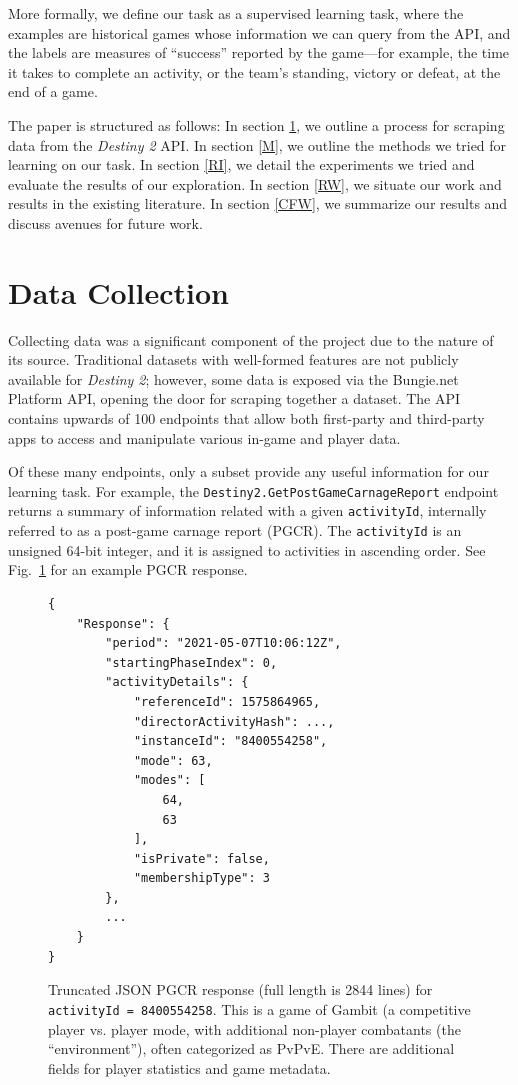 \documentclass[conference]{IEEEtran}
\begin{document}
More formally, we define our task as a supervised learning task, where the
examples are historical games whose information we can query from the API, and
the labels are measures of ``success'' reported by the game—for example, the
time it takes to complete an activity, or the team's standing, victory or
defeat, at the end of a game.

The paper is structured as follows: In section \ref{DC}, we
outline a process for scraping data from the \textit{Destiny 2} API. In
section \ref{M}, we outline the methods we tried for learning on
our task. In section \ref{RI}, we detail the experiments we tried
and evaluate the results of our exploration. In section \ref{RW},
we situate our work and results in the existing literature. In section
\ref{CFW}, we summarize our results and discuss avenues for future
work.

\section{Data Collection}\label{DC}

Collecting data was a significant component of the project due to the nature of
its source. Traditional datasets with well-formed features are not publicly
available for \textit{Destiny 2}; however, some data is exposed via the
Bungie.net Platform API, opening the door for scraping together a dataset. The
API contains upwards of 100 endpoints that allow both first-party and
third-party apps to access and manipulate various in-game and player data.

Of these many endpoints, only a subset provide any useful information for our
learning task. For example, the \texttt{Destiny2.GetPostGameCarnageReport} endpoint returns a
summary of information related with a given \texttt{activityId}, internally
referred to as a post-game carnage report (PGCR). The \texttt{activityId}
is an unsigned 64-bit integer, and it is assigned to activities in ascending
order. See Fig.~\ref{response} for an example PGCR response.

\begin{figure}[htbp]
    \begin{Verbatim}[fontsize=\small]
{
    "Response": {
        "period": "2021-05-07T10:06:12Z",
        "startingPhaseIndex": 0,
        "activityDetails": {
            "referenceId": 1575864965,
            "directorActivityHash": ...,
            "instanceId": "8400554258",
            "mode": 63,
            "modes": [
                64,
                63
            ],
            "isPrivate": false,
            "membershipType": 3
        },
        ...
    }
}
    \end{Verbatim}
    \caption{Truncated JSON PGCR response (full length is 2844 lines) for
        \texttt{activityId = 8400554258}. This is a game of Gambit (a competitive player vs.
        player mode, with additional non-player combatants (the ``environment''), often categorized as PvPvE.
        There are additional fields for player statistics and
        game metadata.}
    \label{response}
\end{figure}
\end{document}
